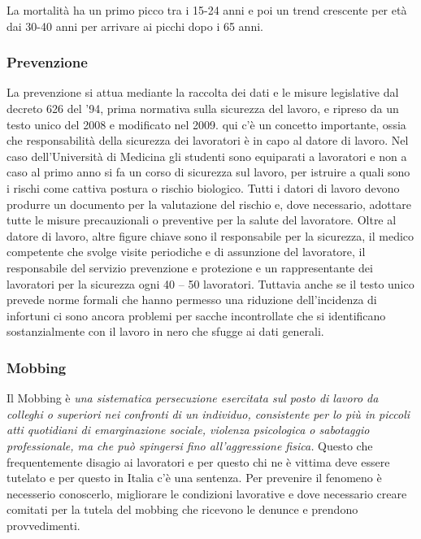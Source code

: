 La mortalità ha un primo picco tra i 15-24 anni e poi un trend crescente
per età dai 30-40 anni per arrivare ai picchi dopo i 65 anni.

\subsubsection{Prevenzione}

La prevenzione si attua mediante la raccolta dei dati e le misure
legislative dal decreto 626 del '94, prima normativa sulla sicurezza del
lavoro, e ripreso da un testo unico del 2008 e modificato nel 2009. qui
c'è un concetto importante, ossia che responsabilità della sicurezza dei
lavoratori è in capo al datore di lavoro. Nel caso dell'Università di
Medicina gli studenti sono equiparati a lavoratori e non a caso al primo
anno si fa un corso di sicurezza sul lavoro, per istruire a quali sono i
rischi come cattiva postura o rischio biologico. Tutti i datori di
lavoro devono produrre un documento per la valutazione del rischio e,
dove necessario, adottare tutte le misure precauzionali o preventive per
la salute del lavoratore. Oltre al datore di lavoro, altre figure chiave
sono il responsabile per la sicurezza, il medico competente che svolge
visite periodiche e di assunzione del lavoratore, il responsabile del
servizio prevenzione e protezione e un rappresentante dei lavoratori per
la sicurezza ogni 40 -- 50 lavoratori. Tuttavia anche se il testo unico
prevede norme formali che hanno permesso una riduzione dell'incidenza di
infortuni ci sono ancora problemi per sacche incontrollate che si
identificano sostanzialmente con il lavoro in nero che sfugge ai dati
generali.

\subsubsection{Mobbing}

Il Mobbing è \emph{una sistematica persecuzione esercitata sul posto di
lavoro da colleghi o superiori nei confronti di un individuo,
consistente per lo più in piccoli atti quotidiani di emarginazione
sociale, violenza psicologica o sabotaggio professionale, ma che può
spingersi fino all'aggressione fisica.} Questo che frequentemente
disagio ai lavoratori e per questo chi ne è vittima deve essere tutelato
e per questo in Italia c'è una sentenza. Per prevenire il fenomeno è
necesserio conoscerlo, migliorare le condizioni lavorative e dove
necessario creare comitati per la tutela del mobbing che ricevono le
denunce e prendono provvedimenti.

